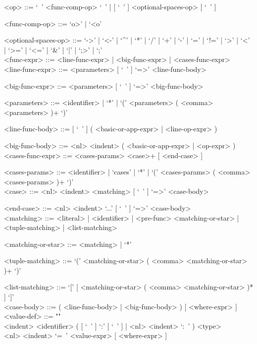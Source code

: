 \documentclass{article}
\begin{document}
\begin{grammar}
<op> ::= `\ ' <func-comp-op> `\ ' | [ `\ ' ] <optional-spaces-op> [ `\ ' ]

<func-comp-op> ::= `o>' | `<o'

<optional-spaces-op> ::= 
`->' | `<-' | `^' | `*' | `/' | `+' | `-' | `=' | `!=' | `>' | `<' | `>=' | `<=' |
`\&' | `|' | `;>' | `;'
\\

<func-expr> ::= <line-func-expr> | <big-func-expr> | <cases-func-expr>
\\

<line-func-expr> ::= <parameters> [ `\ ' ] `=>' <line-func-body>

<big-func-expr> ::= <parameters> [ `\ ' ] `=>' <big-func-body>

<parameters> ::= <identifier> | `*' | `(' <parameters> ( <comma> <parameters> )+ `)'

<line-func-body> ::= [ `\ ' ] ( <basic-or-app-expr> | <line-op-expr> )

<big-func-body> ::= <nl> <indent> ( <basic-or-app-expr> | <op-expr> )
\\

<cases-func-expr> ::= <cases-params> <case>+ [ <end-case> ]

<cases-params> ::=
<identifier> | `cases' | `*' | `(' <cases-params> ( <comma> <cases-params> )+ `)'
\\

<case> ::=  <nl> <indent> <matching> [ `\ ' ] `=>' <case-body>

<end-case> ::= <nl> <indent> `...' [ `\ ' ] `=>' <case-body>
\\

<matching> ::= 
<literal> | <identifier> | <pre-func> <matching-or-star> | <tuple-matching> |
<list-matching>

<matching-or-star> ::= <matching> | `*'

<tuple-matching> ::= `(' <matching-or-star> ( <comma> <matching-or-star> )+ `)'

<list-matching> ::= `[' [ <matching-or-star> ( <comma> <matching-or-star> )* ] `]'
\\

<case-body> ::= ( <line-func-body> | <big-func-body> ) [ <where-expr> ]
\\

<value-def> ::= ""\\
<indent> <identifier> 
( [ `\ ' ] `:' [ `\ ' ] | <nl> <indent> `:\ ' ) <type>  \\
<nl> <indent> `=\ ' <value-expr> [ <where-expr> ]


\end{grammar}
\end{document}
